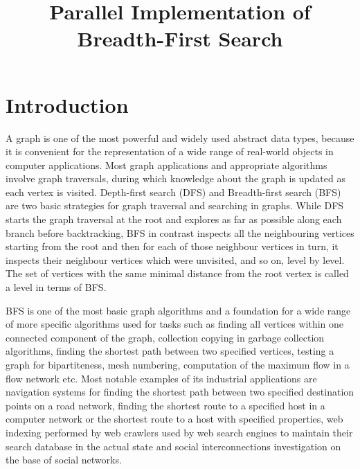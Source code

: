 \documentclass[letterpaper]{article}
\title{Parallel Implementation of Breadth-First Search} %
\begin{document}
	\maketitle

	\begin{abstract} %
		 
	\end{abstract}

	\section{Introduction}\label{sec:intro} %
		A graph is one of the most powerful and widely used abstract data types, because it is convenient for the representation of a wide range of real-world objects in computer applications.
		Most graph applications and appropriate algorithms involve graph traversals, during which knowledge about the graph is updated as each vertex is visited. 
		Depth-first search (DFS) and Breadth-first search (BFS) are two basic strategies for graph traversal and searching in graphs.
		While DFS starts the graph traversal at the root and explores as far as possible along each branch before backtracking, BFS in contrast inspects all the neighbouring vertices starting from the root and then for each of those neighbour vertices in turn, it inspects their neighbour vertices which were unvisited, and so on, level by level.
		The set of vertices with the same minimal distance from the root vertex is called a level in terms of BFS.
				
		BFS is one of the most basic graph algorithms and a foundation for a wide range of more specific algorithms used for tasks such as finding all vertices within one connected component of the graph, collection copying in garbage collection algorithms, finding the shortest path between two specified vertices, testing a graph for bipartiteness, mesh numbering, computation of the maximum flow in a flow network etc.
		Most notable examples of its industrial applications are navigation systems for finding the shortest path between two specified destination points on a road network, finding the shortest route to a specified host in a computer network or the shortest route to a host with specified properties, web indexing performed by web crawlers used by web search engines to maintain their search database in the actual state and social interconnections investigation on the base of social networks.
		
\end{document}
